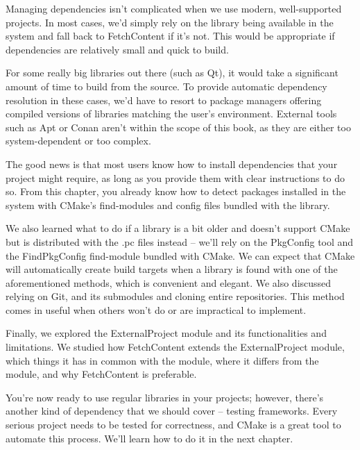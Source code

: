 Managing dependencies isn't complicated when we use modern, well-supported projects. In most cases, we'd simply rely on the library being available in the system and fall back to FetchContent if it's not. This would be appropriate if dependencies are relatively small and quick to build.

For some really big libraries out there (such as Qt), it would take a significant amount of time to build from the source. To provide automatic dependency resolution in these cases, we'd have to resort to package managers offering compiled versions of libraries matching the user's environment. External tools such as Apt or Conan aren't within the scope of this book, as they are either too system-dependent or too complex.

The good news is that most users know how to install dependencies that your project might require, as long as you provide them with clear instructions to do so. From this chapter, you already know how to detect packages installed in the system with CMake's find-modules and config files bundled with the library.

We also learned what to do if a library is a bit older and doesn't support CMake but is distributed with the .pc files instead – we'll rely on the PkgConfig tool and the FindPkgConfig find-module bundled with CMake. We can expect that CMake will automatically create build targets when a library is found with one of the aforementioned methods, which is convenient and elegant. We also discussed relying on Git, and its submodules and cloning entire repositories. This method comes in useful when others won't do or are impractical to implement.

Finally, we explored the ExternalProject module and its functionalities and limitations. We studied how FetchContent extends the ExternalProject module, which things it has in common with the module, where it differs from the module, and why FetchContent is preferable.

You're now ready to use regular libraries in your projects; however, there's another kind of dependency that we should cover – testing frameworks. Every serious project needs to be tested for correctness, and CMake is a great tool to automate this process. We'll learn how to do it in the next chapter.































